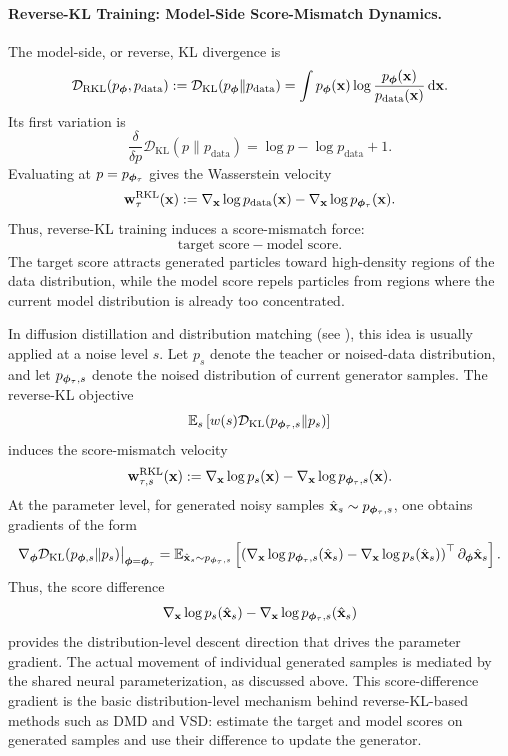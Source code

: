 \paragraph{Reverse-KL Training: Model-Side Score-Mismatch Dynamics.}
The model-side, or reverse, KL divergence is
\[
    \mathcal{D}_{\mathrm{RKL}}(p_{{\bm{\phi}}},p_{\mathrm{data}})
    :=
    \mathcal D_{\mathrm{KL}}(p_{{\bm{\phi}}}\|p_{\mathrm{data}})
    =
    \int
    p_{{\bm{\phi}}}({\mathbf{x}})
    \log
    \frac{p_{{\bm{\phi}}}({\mathbf{x}})}
         {p_{\mathrm{data}}({\mathbf{x}})}
    \mathop{}\!\mathrm{d}{\mathbf{x}}.
\]
Its first variation is
\[
    \frac{\delta}{\delta p}
    \mathcal D_{\mathrm{KL}}(p\|p_{\mathrm{data}})
    =
    \log p-\log p_{\mathrm{data}}+1.
\]
Evaluating at $p=p_{{\bm{\phi}}_\tau}$ gives the Wasserstein velocity
\[
    {\mathbf{w}}_\tau^{\mathrm{RKL}}({\mathbf{x}})
    :=
    \nabla_{{\mathbf{x}}}\log p_{\mathrm{data}}({\mathbf{x}})
    -
    \nabla_{{\mathbf{x}}}\log p_{{\bm{\phi}}_\tau}({\mathbf{x}}).
\]
Thus, reverse-KL training induces a score-mismatch force:
\[
    \text{target score}
    -
    \text{model score}.
\]
The target score attracts generated particles toward high-density regions of the
data distribution, while the model score repels particles from regions where the
current model distribution is already too concentrated.

In diffusion distillation and distribution matching (see ), this idea is usually
applied at a noise level $s$.  Let $p_s$ denote the teacher or noised-data
distribution, and let $p_{{\bm{\phi}}_\tau,s}$ denote the noised distribution of
current generator samples.  The reverse-KL objective
\[
    \mathbb{E}_s
    \left[
        w(s)
        \mathcal D_{\mathrm{KL}}(p_{{\bm{\phi}}_\tau,s}\|p_s)
    \right]
\]
induces the score-mismatch velocity
\[
    {\mathbf{w}}_{\tau,s}^{\mathrm{RKL}}({\mathbf{x}})
    :=
    \nabla_{{\mathbf{x}}}\log p_s({\mathbf{x}})
    -
    \nabla_{{\mathbf{x}}}\log p_{{\bm{\phi}}_\tau,s}({\mathbf{x}}).
\]
At the parameter level, for generated noisy samples
$\hat{{\mathbf{x}}}_s\sim p_{{\bm{\phi}}_\tau,s}$, one obtains gradients of the form
\[
    \nabla_{{\bm{\phi}}}
    \mathcal D_{\mathrm{KL}}(p_{{\bm{\phi}},s}\|p_s)
    \big|_{{\bm{\phi}}={\bm{\phi}}_\tau}
    =
    \mathbb{E}_{\hat{{\mathbf{x}}}_s\sim p_{{\bm{\phi}}_\tau,s}}
    \left[
        \left(
            \nabla_{{\mathbf{x}}}\log p_{{\bm{\phi}}_\tau,s}(\hat{{\mathbf{x}}}_s)
            -
            \nabla_{{\mathbf{x}}}\log p_s(\hat{{\mathbf{x}}}_s)
        \right)^\top
        \partial_{{\bm{\phi}}}\hat{{\mathbf{x}}}_s
    \right].
\]
Thus, the score difference
\[
\nabla_{{\mathbf{x}}}\log p_s(\hat{{\mathbf{x}}}_s)
-
\nabla_{{\mathbf{x}}}\log p_{{\bm{\phi}}_\tau,s}(\hat{{\mathbf{x}}}_s)
\]
provides the distribution-level descent direction that drives the parameter
gradient. The actual movement of individual generated samples is mediated by
the shared neural parameterization, as discussed above. This score-difference gradient is the basic distribution-level mechanism
behind reverse-KL-based methods such as DMD and VSD: estimate the target and
model scores on generated samples and use their difference to update the
generator.

